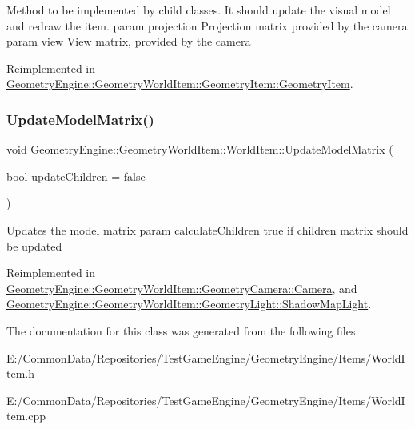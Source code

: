 Method to be implemented by child classes. It should update the visual model and redraw the item. param projection Projection matrix provided by the camera param view View matrix, provided by the camera 

Reimplemented in \mbox{\hyperlink{class_geometry_engine_1_1_geometry_world_item_1_1_geometry_item_1_1_geometry_item_aa07c13861cf4aef269442071e4150389}{Geometry\+Engine\+::\+Geometry\+World\+Item\+::\+Geometry\+Item\+::\+Geometry\+Item}}.

\mbox{\label{class_geometry_engine_1_1_geometry_world_item_1_1_world_item_a86effd24c41c87be8925ee3addd8c33d}} 
\subsubsection{\texorpdfstring{UpdateModelMatrix()}{UpdateModelMatrix()}}
{\footnotesize\ttfamily void Geometry\+Engine\+::\+Geometry\+World\+Item\+::\+World\+Item\+::\+Update\+Model\+Matrix (\begin{DoxyParamCaption}\item[{bool}]{update\+Children = {\ttfamily false} }\end{DoxyParamCaption})\hspace{0.3cm}{\ttfamily [virtual]}}

Updates the model matrix param calculate\+Children true if children matrix should be updated 

Reimplemented in \mbox{\hyperlink{class_geometry_engine_1_1_geometry_world_item_1_1_geometry_camera_1_1_camera_afe7145a1edb13ce3a50c2964f5c865e9}{Geometry\+Engine\+::\+Geometry\+World\+Item\+::\+Geometry\+Camera\+::\+Camera}}, and \mbox{\hyperlink{class_geometry_engine_1_1_geometry_world_item_1_1_geometry_light_1_1_shadow_map_light_a0465932bd0494929e5daa10ce8b77aa6}{Geometry\+Engine\+::\+Geometry\+World\+Item\+::\+Geometry\+Light\+::\+Shadow\+Map\+Light}}.



The documentation for this class was generated from the following files\+:\begin{DoxyCompactItemize}
\item 
E\+:/\+Common\+Data/\+Repositories/\+Test\+Game\+Engine/\+Geometry\+Engine/\+Items/World\+Item.\+h\item 
E\+:/\+Common\+Data/\+Repositories/\+Test\+Game\+Engine/\+Geometry\+Engine/\+Items/World\+Item.\+cpp\end{DoxyCompactItemize}
